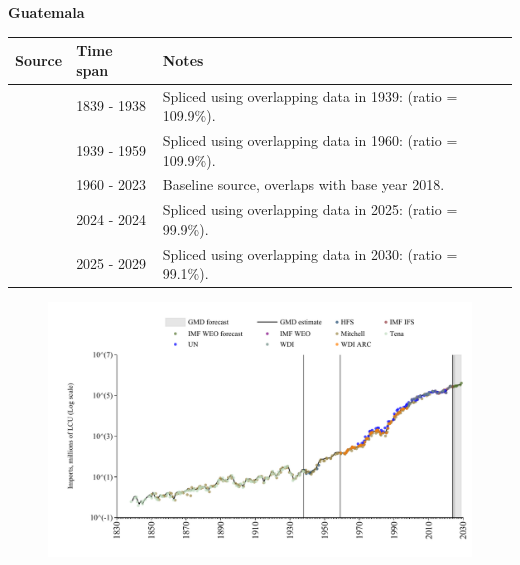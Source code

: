 \documentclass[12pt,a4paper,landscape]{article}
\begin{document}
\begin{adjustbox}{max totalsize={\paperwidth}{\paperheight},center}
\begin{minipage}[t][\textheight][t]{\textwidth}
\vspace*{0.5cm}
{}
\begin{center}
{\Large\bfseries Guatemala}
\end{center}
\vspace{0.5cm}
\begin{table}[H]
\centering
\small
\begin{tabular}{|l|l|l|}
\hline
\textbf{Source} & \textbf{Time span} & \textbf{Notes} \\
\hline
\rowcolor{white}\cite{Tena}& 1839 - 1938 &Spliced using overlapping data in 1939: (ratio = 109.9\%).\\
\rowcolor{lightgray}\cite{Mitchell}& 1939 - 1959 &Spliced using overlapping data in 1960: (ratio = 109.9\%).\\
\rowcolor{white}\cite{WDI}& 1960 - 2023 &Baseline source, overlaps with base year 2018.\\
\rowcolor{lightgray}\cite{IMF_IFS}& 2024 - 2024 &Spliced using overlapping data in 2025: (ratio = 99.9\%).\\
\rowcolor{white}\cite{IMF_WEO_forecast}& 2025 - 2029 &Spliced using overlapping data in 2030: (ratio = 99.1\%).\\
\hline
\end{tabular}
\end{table}
\begin{figure}[H]
\centering
\includegraphics[width=\textwidth,height=0.6\textheight,keepaspectratio]{graphs/GTM_imports.pdf}
\end{figure}
\end{minipage}
\end{adjustbox}
\end{document}
